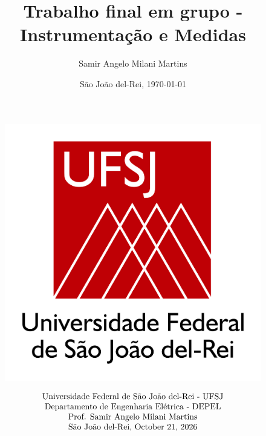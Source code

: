 \documentclass[12pt,a4paper]{article}
\begin{document}
\newtheorem{obs}{Observação}
\newtheorem{etp}{Etapa}
\newtheorem{ext}{Extra}
\author{Samir Angelo Milani Martins}


\date{São João del-Rei, \today}

\title{Trabalho final em grupo - Instrumentação e Medidas}
\pagestyle{fancy}

\lfoot{} \rfoot{ \hfill \small \thepage/\pageref{lastpage}} 
\cfoot{} \chead{ }
\lhead{\small }


  \begin{minipage}{\linewidth}
      \centering
      \begin{minipage}{0.25\linewidth}
      \begin{figure}[H]
         \centering
	   \includegraphics[angle=0, scale=.3]{ufsj_logo.jpg}\\       	
          \end{figure}
      \end{minipage}
      \hspace{0.05\linewidth}
      \begin{minipage}{0.45\linewidth}
       	\begin{eqnarray}
	  \begin{array}{c}
	 \mbox{Universidade Federal de São João del-Rei - UFSJ} \nonumber \\
	 \mbox{Departamento de Engenharia Elétrica - DEPEL} \nonumber \\
	  \mbox{Prof. Samir Angelo Milani Martins} \nonumber \\
	 \mbox{São João del-Rei, \today}
	 \end{array}
	 \end{eqnarray}
      \end{minipage}
  \end{minipage}
\end{document}
